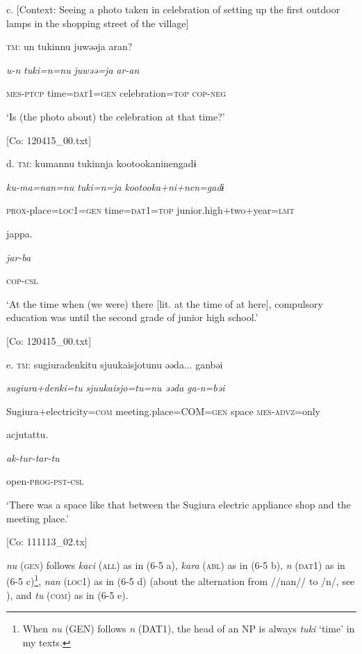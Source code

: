   c.  [Context: Seeing a photo taken in celebration of setting up the first outdoor lamps in the shopping street of the village]

    \textsc{tm}:  un  tukinnu  juwəəja  aran?

      \textit{u-n}  \textit{tuki=n=nu}  \textit{juwəə=ja}  \textit{ar-an}

      \textsc{mes}-\textsc{ptcp}  time=\textsc{dat}1=\textsc{gen}  celebration=\textsc{top}  \textsc{cop}-\textsc{neg}

      ‘Is (the photo about) the celebration at that time?’

      [Co: 120415\_00.txt]

  d.  \textsc{tm}:  kumannu  tukinnja  {\textbar}kootookaninen{\textbar}gadɨ

      \textit{ku-ma=nan=nu}  \textit{tuki=n=ja}  \textit{kootooka+ni+nen=gadɨ}

      \textsc{prox}-place=\textsc{loc}1=\textsc{gen}  time=\textsc{dat}1=\textsc{top}  junior.high+two+year=\textsc{lmt}

      jappa.

      \textit{jar-ba}

      \textsc{cop}-\textsc{csl}

      ‘At the time when (we were) there [lit. at the time of at here], compulsory education was until the second grade of junior high school.’

      [Co: 120415\_00.txt]

  e.  \textsc{tm}:  {\textbar}sugiuradenki{\textbar}tu  {\textbar}sjuukaisjo{\textbar}tunu  əəda...  ganbəi

      \textit{sugiura+denki=tu}  \textit{sjuukaisjo=tu=nu}  \textit{əəda}  \textit{ga-n=bəi}

      Sugiura+electricity=\textsc{com}  meeting.place=COM=\textsc{gen}  space  \textsc{mes}-\textsc{advz}=only

      acjutattu.

      \textit{ak-tur-tar-tu}

      open-\textsc{prog}-\textsc{pst}-\textsc{csl}

      ‘There was a space like that between the Sugiura electric appliance shop and the meeting place.’

      [Co: 111113\_02.tx]

\textit{nu} (\textsc{gen}) follows \textit{kaci} (\textsc{all}) as in (6-5 a), \textit{kara} (\textsc{abl}) as in (6-5 b), \textit{n} (\textsc{dat}1) as in (6-5 c)\footnote{When \textit{nu} (GEN) follows \textit{n} (DAT1), the head of an NP is always \textit{tuki} ‘time’ in my texts.}, \textit{nan} (\textsc{loc}1) as in (6-5 d) (about the alternation from //nan// to /n/, see ), and \textit{tu} (\textsc{com}) as in (6-5 e).

